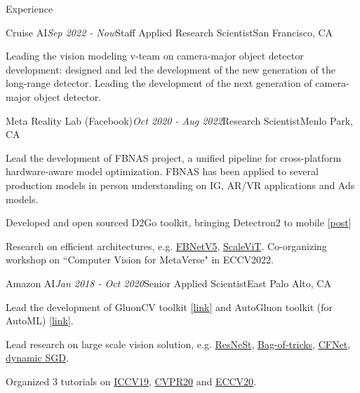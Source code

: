 \documentclass{resume} %
\begin{document}
\begin{rSection}{Experience}

\begin{rSubsection}{Cruise AI}{\em Sep 2022 - Now}{Staff Applied Research Scientist}{San Francisco, CA}
\item Leading the vision modeling v-team on camera-major object detector development: designed and led the development of the new generation of the long-range detector. Leading the development of the next generation of camera-major object detector.
\end{rSubsection}

\begin{rSubsection}{Meta Reality Lab (Facebook)}{\em Oct 2020 - Aug 2022}{Research Scientist}{Menlo Park, CA} %
\item Lead the development of FBNAS project, a unified pipeline for cross-platform hardware-aware model optimization. FBNAS has been applied to several production models in person understanding on IG, AR/VR applications and Ads models.
\item Developed and open sourced D2Go toolkit, bringing Detectron2 to mobile [\href{https://ai.facebook.com/blog/d2go-brings-detectron2-to-mobile/}{post}]
\item Research on efficient architectures, e.g. \href{https://scholar.google.com/citations?view_op=view_citation&hl=en&user=gCoWdkUAAAAJ&sortby=pubdate&citation_for_view=gCoWdkUAAAAJ:ML0RJ9NH7IQC}{FBNetV5}, \href{https://scholar.google.com/citations?view_op=view_citation&hl=en&user=gCoWdkUAAAAJ&sortby=pubdate&citation_for_view=gCoWdkUAAAAJ:p__nRnzSRKYC}{ScaleViT}. Co-organizing workshop on ``Computer Vision for MetaVerse" in ECCV2022.
\end{rSubsection}

\begin{rSubsection}{Amazon AI}{\em Jan 2018 - Oct 2020}{Senior Applied Scientist}{East Palo Alto, CA} %
\item Lead the development of GluonCV toolkit [\href{https://cv.gluon.ai/contents.html}{link}] and AutoGluon toolkit (for AutoML) [\href{https://auto.gluon.ai/stable/index.html}{link}]. 
\item Lead research on large scale vision solution, e.g. \href{https://scholar.google.com/citations?view_op=view_citation&hl=en&user=gCoWdkUAAAAJ&citation_for_view=gCoWdkUAAAAJ:0KyAp5RtaNEC}{ResNeSt}, \href{https://scholar.google.com/citations?view_op=view_citation&hl=en&user=gCoWdkUAAAAJ&citation_for_view=gCoWdkUAAAAJ:fEOibwPWpKIC}{Bag-of-tricks}, \href{https://scholar.google.com/citations?view_op=view_citation&hl=en&user=gCoWdkUAAAAJ&citation_for_view=gCoWdkUAAAAJ:-_dYPAW6P2MC}{CFNet}, \href{https://scholar.google.com/citations?view_op=view_citation&hl=en&user=gCoWdkUAAAAJ&sortby=pubdate&citation_for_view=gCoWdkUAAAAJ:35r97b3x0nAC}{dynamic SGD}. 
\item Organized 3 tutorials on \href{https://iccv2019.thecvf.com/program/tutorials}{ICCV19}, \href{http://hangzhang.org/CVPR2020/}{CVPR20} and \href{https://hangzhang.org/ECCV2020/}{ECCV20}. 
\end{rSubsection}


\end{rSection}
\end{document}
